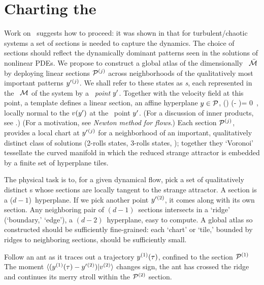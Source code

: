 \section{Charting the \statesp}
	\label{sec:chart}

Work on \KS\ suggests how to proceed: it was shown in
 that for turbulent/chaotic systems a set of
\Poincare sections is needed to capture the dynamics. The choice of
sections should reflect the dynamically dominant patterns seen in the
solutions of nonlinear PDEs. We propose to construct a global atlas of
the dimensionally \reducedsp\ $\bar{\cal M}$ by deploying linear \Poincare
sections ${\cal P}{}^{(j)}$ across neighborhoods of the qualitatively most important
patterns ${y'}{}^{(j)}$.
We shall refer to these states as \emph{\template s}, each
represented in the \statesp\ ${\cal M}$ of the system by
a \emph{\template\ point} ${y'}$. Together with the velocity
field at this point, a template defines a linear \Poincare section,
an affine hyperplane $y \in {\cal P}$,
\beq
    \vel(\slicep) \cdot (\sspRed - \slicep)= 0
\,,
locally normal to the $v({y'})$ at the \template\ point ${y'}$.
(For a discussion of inner products, see
.)
(For a motivation, see
 \emph{Newton method for flows}.)
Each \Poincare section ${\cal P}{}^{(j)}$, provides a local chart
at ${y'}{}^{(j)}$ for a
neighborhood of an important, qualitatively distinct class of solutions
(2-rolls states, 3-rolls states, \etc); together they `Voronoi'
tessellate  the curved manifold in which the reduced strange attractor is
embedded by a finite set of hyperplane
tiles.

The physical task is to, for a given dynamical flow, pick a set of
qualitatively distinct {\template s} whose \Poincare sections are locally tangent
to the strange attractor.
A \Poincare section is a
($d\!-\!1$)\dmn\ hyperplane. If we pick another {\template} point
${y'}{}^{(2)}$, it comes along with its own \Poincare section. Any
neighboring pair of $(d\!-\!1)$\dmn\ \Poincare sections intersects in a `ridge'
(`boundary,' `edge'), a $(d\!-\!2)$\dmn\ hyperplane, easy to compute.
A global atlas so constructed should be sufficiently
fine-grained: each `chart' or `tile,' bounded by ridges to
neighboring \Poincare sections, should be sufficiently small.

Follow an ant as it traces out a trajectory
$y{}^{(1)}(\tau)$, confined to the \Poincare section ${\cal P}{}^{(1)}$
The
moment $\braket{(\sspRed{}^{(1)}(\tau)-\slicep{}^{(2)})}{\vel{}{}^{(2)}}$ changes
sign, the ant has crossed the ridge and  continues its merry stroll within the
${\cal P}{}^{(2)}$ \Poincare section.

